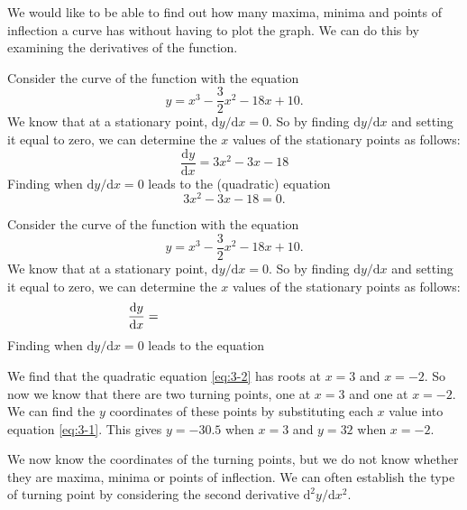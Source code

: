 \documentclass[
  english,
  11pt,
  oneside]{book}
\newcommand{\slide}{}
\theoremstyle{definition}
\theoremstyle{definition}
\theoremstyle{definition}
\theoremstyle{definition}
\theoremstyle{remark}
\begin{document}
\slide

We would like to be able to find out how many maxima, minima and points of inflection a curve has without having to plot the graph. We can do this by examining the derivatives of the function.

\begin{notslides}

Consider the curve of the function with the equation
\[
y = x^3-\frac 32x^2-18x+10.
\]
We know that at a stationary point, \(\mathrm{d}y/\mathrm{d} x=0\). So by finding \(\mathrm{d}y/\mathrm{d} x\) and setting it equal to zero, we can determine the \(x\) values of the stationary points as follows:
\begin{equation}
\frac{\mathrm{d} y}{\mathrm{d} x} = 3x^2-3x-18
\label{eq:3-1}
\end{equation}
Finding when \(\mathrm{d}y/\mathrm{d} x = 0\) leads to the (quadratic) equation
\begin{equation}
3x^2-3x-18=0.
\label{eq:3-2}
\end{equation}

\end{notslides}

\begin{slidesonly}

Consider the curve of the function with the equation
\[
y = x^3-\frac 32x^2-18x+10.
\]
We know that at a stationary point, \(\mathrm{d}y/\mathrm{d} x=0\). So by finding \(\mathrm{d}y/\mathrm{d} x\) and setting it equal to zero, we can determine the \(x\) values of the stationary points as follows:
\begin{equation}
\frac{\mathrm{d} y}{\mathrm{d} x} =\hbox to 5cm{}
\label{eq:3-1}
\end{equation}
Finding when \(\mathrm{d}y/\mathrm{d} x = 0\) leads to the equation
\begin{equation}
\label{eq:3-2}
\end{equation}

\end{slidesonly}

\slide

\begin{notslides}

We find that the quadratic equation \eqref{eq:3-2} has roots at \(x = 3\) and \(x = -2\). So now we know that there are two turning points, one at \(x = 3\) and one at \(x = -2\). We can find the \(y\) coordinates of these points by substituting each \(x\) value into equation \eqref{eq:3-1}. This gives \(y = -30.5\) when \(x = 3\) and \(y = 32\) when \(x = -2\).

We now know the coordinates of the turning points, but we do not know whether they are maxima, minima or points of inflection. We can often establish the type of turning point by considering the second derivative \(\mathrm{d}^{2}y/\mathrm{d} x^2\).

\end{notslides}
\end{document}
